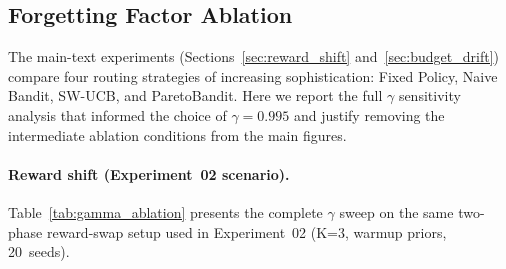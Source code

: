 %

\subsection{Forgetting Factor Ablation}
\label{app:forgetting_ablation}

The main-text experiments (Sections~\ref{sec:reward_shift}
and~\ref{sec:budget_drift}) compare four routing strategies of
increasing sophistication: Fixed Policy, Naive Bandit, SW-UCB,
and ParetoBandit.
Here we report the full $\gamma$ sensitivity analysis that informed
the choice of $\gamma{=}0.995$ and justify removing the
intermediate ablation conditions from the main figures.

\paragraph{Reward shift (Experiment~02 scenario).}
Table~\ref{tab:gamma_ablation} presents the complete $\gamma$
sweep on the same two-phase reward-swap setup used in
Experiment~02 (K=3, warmup priors, 20~seeds).


